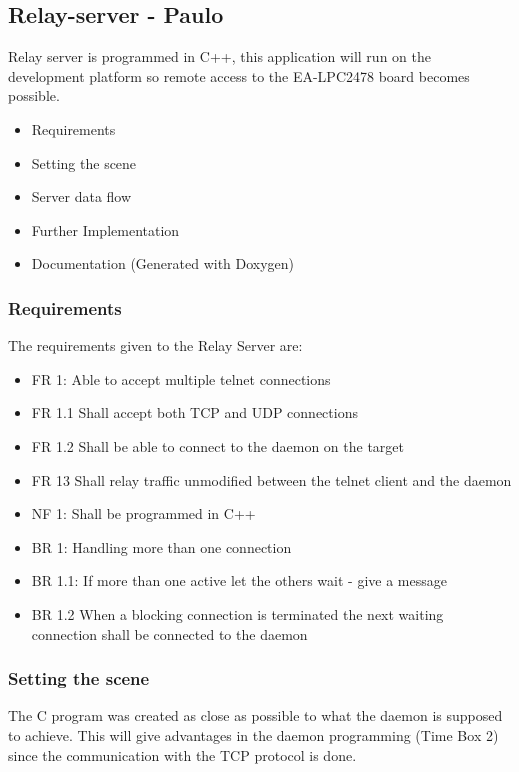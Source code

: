 \subsection{Relay-server - Paulo}
Relay server is programmed in C++, this application will run on the development platform so remote access to the EA-LPC2478 board becomes possible.

\begin{itemize}
	\item Requirements
	\item Setting the scene
	\item Server data flow
	\item Further Implementation
	\item Documentation (Generated with Doxygen)
\end{itemize}

\subsubsection{Requirements}
The requirements given to the Relay Server are:

\begin{itemize}
	\item FR 1: Able to accept multiple telnet connections
	\item FR 1.1 Shall accept both TCP and UDP connections
 	\item FR 1.2 Shall be able to connect to the daemon on the target
 	\item FR 13 Shall relay traffic unmodified between the telnet client and the daemon
 	\item NF 1: Shall be programmed in C++
 	\item BR 1: Handling more than one connection
 	\item BR 1.1: If more than one active let the others wait - give a message
 	\item BR 1.2 When a blocking connection is terminated the next waiting connection shall be connected to the daemon
\end{itemize}

\subsubsection{Setting the scene}
The C program was created as close as possible to what the daemon is supposed to achieve. This will give advantages in the daemon programming (Time Box 2) since the communication with the TCP protocol is done.

